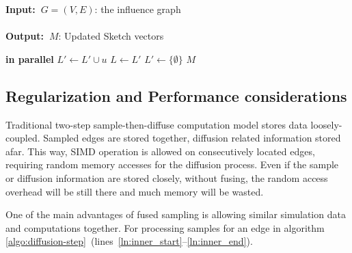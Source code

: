 \documentclass[10pt,journal,compsoc]{IEEEtran}
\renewcommand{\algorithmicrequire}{\textbf{Input:~}}
\renewcommand{\algorithmicensure}{\textbf{Output:~}}
\begin{document}
\begin{algorithm}[!ht]
\caption{($G,M,J,R_S$)}
\label{algo:diffusion-step}
\algorithmicrequire{$G = (V,E)$: the influence graph
\\
\\}
\algorithmicensure{$M$: Updated Sketch vectors
}
\begin{algorithmic}[1]
         {\bf in parallel} \label{ln:inner_start} %
            \For{$j \in (0,J]$}
                 \label{ln:early_exit}
                    \label{ln:update}         
                \EndIf
            \EndFor
                \State $L' \leftarrow L' \cup u $ \label{ln:inner_end}
            \EndIf
        \EndFor
        \EndFor
        \State $L \leftarrow L'$
        \State $L' \leftarrow \{\emptyset\}$
    \EndWhile
    \State \Return $M$
\end{algorithmic}
\end{algorithm}

\subsection{Regularization and Performance considerations}
Traditional two-step sample-then-diffuse computation model stores data loosely-coupled. Sampled edges are stored together, diffusion related information stored afar. This way, SIMD operation is allowed on consecutively located edges, requiring random memory accesses for the diffusion process. Even if the sample or diffusion information are stored closely, without fusing, the random access overhead will be still there and much memory will be wasted. 

One of the main advantages of fused sampling is allowing similar simulation data and computations together. For processing samples for an edge in algorithm \ref{algo:diffusion-step}~(lines~\ref{ln:inner_start}--\ref{ln:inner_end}).  
\end{document}
